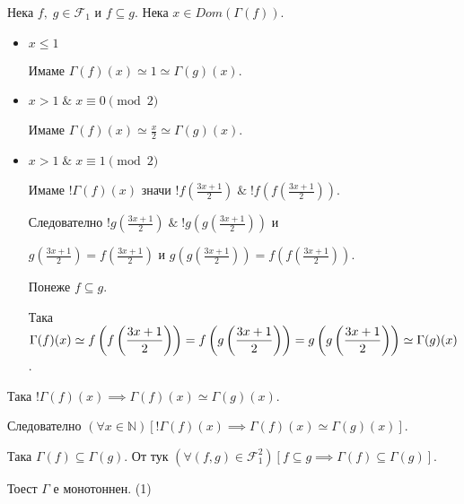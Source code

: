 \documentclass{article}
\begin{document}
Нека \(f, \; g \in \mathcal{F}_1\) и \(f \subseteq g\). Нека \(x \in Dom(\Gamma(f))\).
\begin{itemize}
\item \(x \leq 1\)

Имаме \(\Gamma(f)(x) \simeq 1 \simeq \Gamma(g)(x)\).
\item \(x > 1 \; \& \; x \equiv 0 \pmod{2}\)

Имаме \(\Gamma(f)(x) \simeq \displaystyle\frac{x}{2} \simeq \Gamma(g)(x)\).
\item \(x > 1 \; \& \; x \equiv 1 \pmod{2}\)

Имаме \(!\Gamma(f)(x)\) значи \(!\displaystyle{f\left(\frac{3x + 1}{2}\right)} \; \& \; !\displaystyle{f\left(f\left(\frac{3x + 1}{2}\right)\right)}\).

Следователно \(!\displaystyle{g\left(\frac{3x + 1}{2}\right)} \; \& \; !\displaystyle{g\left(g\left(\frac{3x + 1}{2}\right)\right)}\) и

\(\displaystyle{g\left(\frac{3x + 1}{2}\right)} = \displaystyle{f\left(\frac{3x + 1}{2}\right)}\) и \(\displaystyle{g\left(g\left(\frac{3x + 1}{2}\right)\right)} = \displaystyle{f\left(f\left(\frac{3x + 1}{2}\right)\right)}\).

Понеже \(f \subseteq g\).

Така \(\Gamma(f)(x) \simeq \displaystyle{f\left(f\left(\frac{3x + 1}{2}\right)\right)} = \displaystyle{f\left(g\left(\frac{3x + 1}{2}\right)\right)} = \\
\displaystyle{g\left(g\left(\frac{3x + 1}{2}\right)\right)} \simeq \Gamma(g)(x)\).
\end{itemize}
Така \(!\Gamma(f)(x) \implies \Gamma(f)(x) \simeq \Gamma(g)(x)\).

Следователно \((\forall x \in \mathbb{N})[!\Gamma(f)(x) \implies \Gamma(f)(x) \simeq \Gamma(g)(x)]\).

Така \(\Gamma(f) \subseteq \Gamma(g)\). От тук \((\forall (f, g) \in \mathcal{F}_1^2)[f \subseteq g \implies \Gamma(f) \subseteq \Gamma(g)]\).

Тоест \(\Gamma\) е монотоннен. (1)
\end{document}
